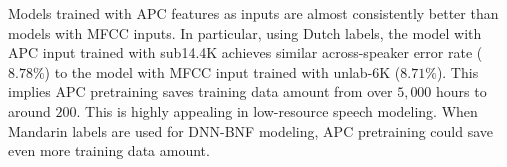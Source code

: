 \documentclass[a4paper]{article}
\begin{document}
Models trained with APC features as inputs are almost consistently better than models with MFCC inputs. 
In particular, using Dutch labels,  the model with APC input  trained with sub14.4K achieves similar across-speaker error rate ($8.78\%$)  to the model with MFCC input trained with unlab-6K ($8.71\%$). This implies  APC pretraining saves training data amount from over $5,000$ hours to around $200$. This is highly appealing in low-resource speech modeling. When Mandarin labels are used for DNN-BNF modeling, APC pretraining  could save even more training data amount. 






\end{document}
